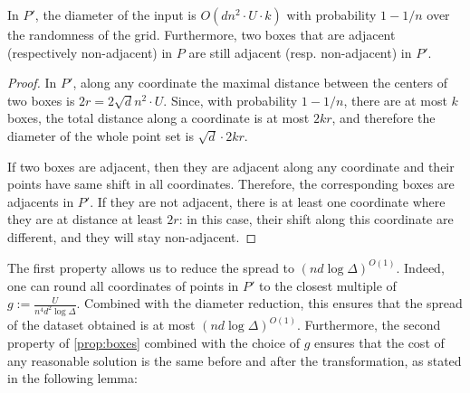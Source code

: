 \begin{proposition}\label{prop:boxes}
In $P'$, the diameter of the input is $O(d n^2\cdot U \cdot k)$ with probability $1-1/n$ over the randomness of the grid.
Furthermore, two boxes that are adjacent (respectively non-adjacent) in $P$  are still adjacent (resp. non-adjacent) in $P'$.
\end{proposition}
\begin{proof}
In $P'$, along any
coordinate the maximal distance between the centers of two boxes is $2r = 2\sqrt d n^2\cdot U$. Since, with probability $1-1/n$, there are at most $k$ boxes, the total distance along a coordinate is at most $2kr$, and therefore the diameter of the whole point set is $\sqrt{d} \cdot 2kr$.

If two boxes are adjacent, then they are adjacent along any coordinate and their points have same shift in all coordinates. Therefore, the corresponding boxes are adjacents in $P'$. If they are not adjacent, there is at least one coordinate where they are at distance at least $2r$: in this case, their shift along this coordinate are different, and they will stay non-adjacent.
\end{proof}

The first property allows us to reduce the spread to $(nd \log \Delta)^{O(1)}$.  Indeed, one can round all coordinates of points in $P'$ to the closest multiple
of $g := \frac{U}{n^4 d^{2} \log \Delta}$.  Combined with the diameter reduction, this ensures that the spread of the dataset obtained is at most $(nd \log
\Delta)^{O(1)}$.  Furthermore, the second property of \cref{prop:boxes} combined with the choice of $g$ ensures that the cost of any reasonable solution is the
same before and after the transformation, as stated in the following lemma:

